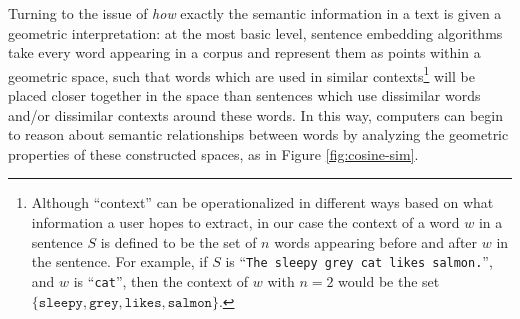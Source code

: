 \documentclass[11pt]{article}
\begin{document}
Turning to the issue of \textit{how} exactly the semantic information in a text is given a geometric interpretation: at the most basic level, sentence embedding algorithms take every word appearing in a corpus and represent them as points within a geometric space, such that words which are used in similar contexts\footnote{Although ``context'' can be operationalized in different ways based on what information a user hopes to extract, in our case the context of a word $w$ in a sentence $S$ is defined to be the set of $n$ words appearing before and after $w$ in the sentence. For example, if $S$ is ``\texttt{The sleepy grey cat likes salmon.}'', and $w$ is ``\texttt{cat}'', then the context of $w$ with $n = 2$ would be the set $\{\texttt{sleepy}, \texttt{grey}, \texttt{likes}, \texttt{salmon}\}$.} will be placed closer together in the space than sentences which use dissimilar words and/or dissimilar contexts around these words. In this way, computers can begin to reason about semantic relationships between words by analyzing the geometric properties of these constructed spaces, as in Figure \ref{fig:cosine-sim}.
\end{document}
